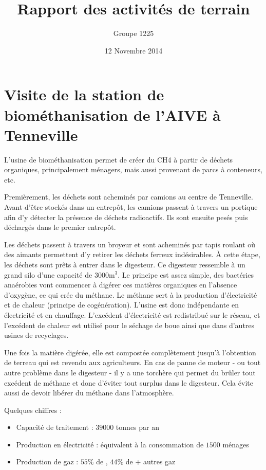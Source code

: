 \documentclass[a4paper, oneside, 12pt]{article}
\title{Rapport des activités de terrain}
\author{Groupe 1225}
\date{12 Novembre 2014}
\begin{document}
\maketitle

\section{Visite de la station de biométhanisation de l’AIVE à Tenneville}

L’usine de biométhanisation permet de créer du CH4 à partir de déchets organiques,
principalement ménagers, mais aussi provenant de parcs à conteneurs, etc.

Premièrement, les déchets sont acheminés par camions au centre de Tenneville.
Avant d’être stockés dans un entrepôt, les camions passent à travers un portique afin 
d'y détecter la présence de déchets radioactifs. Ils sont ensuite pesés
puis déchargés dans le premier entrepôt.

Les déchets passent à travers un broyeur et sont acheminés par tapis roulant 
où des aimants permettent d’y retirer les déchets ferreux indésirables.
À cette étape, les déchets sont prêts à entrer dans le digesteur. 
Ce digesteur ressemble à un grand silo d’une capacité de $3000 \si{\meter\cubed}$.
Le principe est assez simple, des bactéries anaérobies vont commencer à digérer 
ces matières organiques en l’absence d’oxygène, ce qui crée du méthane. 
Le méthane sert à la production d’électricité et de chaleur (principe de cogénération).
L’usine est donc indépendante en électricité et en chauffage.
L’excédent  d’électricité est redistribué sur le réseau, et l’excédent de chaleur 
est utilisé pour le séchage de boue ainsi que dans d’autres usines de recyclages. 

Une fois la matière digérée, elle est compostée complètement jusqu’à l’obtention 
de terreau qui est revendu aux agriculteurs.
En cas de panne de moteur - ou tout autre problème dans le digesteur -
il y a une torchère qui permet du brûler tout excédent de méthane
et donc d'éviter tout surplus dans le digesteur. Cela évite aussi de devoir 
libérer du méthane dans l’atmosphère.

Quelques chiffres :
\begin{itemize}
	\item Capacité de traitement : $39 000$ tonnes par an
	\item Production en électricité : équivalent à la consommation de $1500$ ménages
	\item Production de gaz : $55\%$ de , $44\%$ de  + autres gaz
\end{itemize}
\end{document}
